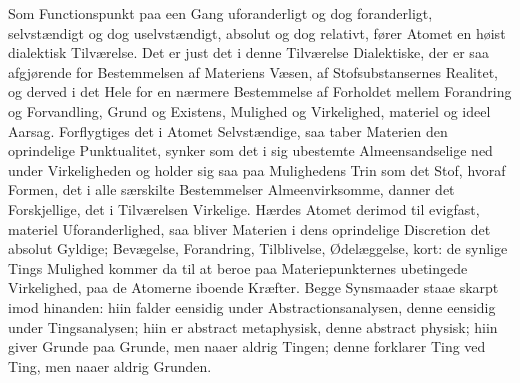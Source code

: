 \documentclass[12pt,a4paper]{book}
\begin{document}
Som Functionspunkt paa een Gang uforanderligt og dog
foranderligt, selvstændigt og dog uselvstændigt, absolut og dog
relativt, fører Atomet en høist dialektisk Tilværelse. Det
er just det i denne Tilværelse Dialektiske, der er saa
afgjørende for Bestemmelsen af Materiens Væsen, af
Stofsubstansernes Realitet, og derved i det Hele for en nærmere
Bestemmelse af Forholdet mellem Forandring og Forvandling,
Grund og Existens, Mulighed og Virkelighed, materiel
og ideel Aarsag. Forflygtiges det i Atomet Selvstændige,
saa taber Materien den oprindelige Punktualitet, synker som
det i sig ubestemte Almeensandselige ned under Virkeligheden
og holder sig saa paa Mulighedens Trin som det Stof,
hvoraf Formen, det i alle særskilte Bestemmelser
Almeenvirksomme, danner det Forskjellige, det i Tilværelsen
Virkelige. Hærdes Atomet derimod til evigfast, materiel
Uforanderlighed, saa bliver Materien i dens oprindelige Discretion
det absolut Gyldige; Bevægelse, Forandring, Tilblivelse,
Ødelæggelse, kort: de synlige Tings Mulighed kommer da til at
beroe paa Materiepunkternes ubetingede Virkelighed, paa de
Atomerne iboende Kræfter. Begge Synsmaader staae skarpt
imod hinanden: hiin falder eensidig under Abstractionsanalysen,
denne eensidig under Tingsanalysen; hiin er abstract
metaphysisk, denne abstract physisk; hiin giver Grunde paa Grunde,
men naaer aldrig Tingen; denne forklarer Ting ved Ting,
men naaer aldrig Grunden.
\end{document}

